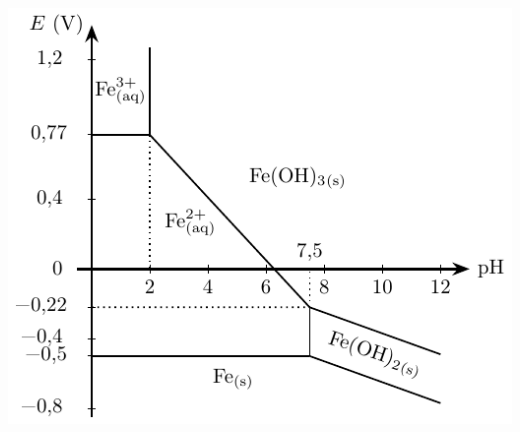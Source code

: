 \documentclass[a4paper, 10pt, final, garamond]{book}
\begin{document}
\begin{enumerate}[label=\sqenumi]
\begin{minipage}[t]{.35\linewidth}
\begin{center}
{			}{
				\includegraphics[width=\linewidth]{eph_fer}
			}
		\end{center}
	\end{minipage}
	\smallbreak
	\begin{enumerate}

\end{enumerate}
\end{enumerate}
\end{document}
